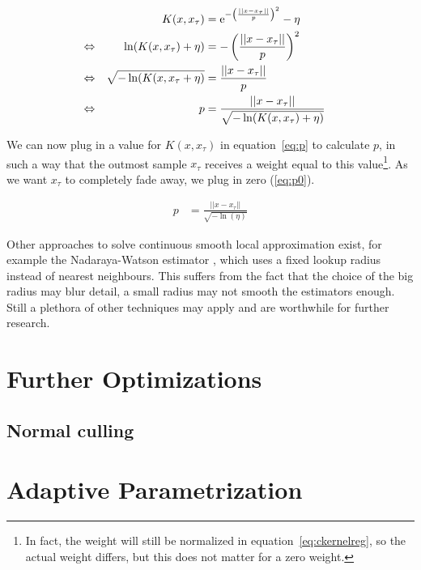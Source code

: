 \begin{align}
&&K(x, x_\tau)&=\mathrm{e}^{-\left(\frac{||x-x_\tau||}{p}\right)^2} - \eta \label{eq:modgaussiankernel} &&\\
\Leftrightarrow&&\ln(K(x, x_\tau) + \eta) &= -\left(\frac{||x-x_\tau||}{p}\right)^2 \notag &&\\
\Leftrightarrow&& \sqrt{-\ln(K(x, x_\tau + \eta)} &= \frac{||x-x_\tau||}{p} \notag &&\\
\Leftrightarrow&& p &= \frac{||x-x_\tau||}{\sqrt{-\ln(K(x, x_\tau) + \eta)}} \label{eq:p}&&
\end{align}

We can now plug in a value for $K(x, x_\tau)$ in equation~\ref{eq:p} to calculate $p$, in such a way that the outmost sample $x_\tau$ receives a weight equal to this value\footnote{In fact, the weight will still be normalized in equation~\ref{eq:ckernelreg}, so the actual weight differs, but this does not matter for a zero weight.}. As we want $x_\tau$ to completely fade away, we plug in zero (\ref{eq:p0}).

\begin{align}
p &= \frac{||x-x_\tau||}{\sqrt{-\ln(\eta)}} \label{eq:p0}
\end{align}

Other approaches to solve continuous smooth local approximation exist, for example the Nadaraya-Watson estimator \cite{nadaraya1964estimating}, which uses a fixed lookup radius instead of nearest neighbours. This suffers from the fact that the choice of the big radius may blur detail, a small radius may not smooth the estimators enough. Still a plethora of other techniques may apply and are worthwhile for further research.


\section{Further Optimizations}



\subsection{Normal culling}






\section{Adaptive Parametrization}

